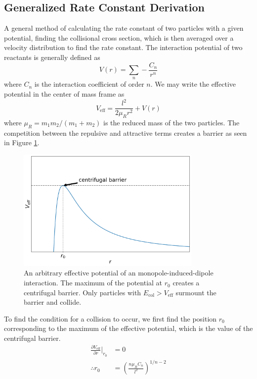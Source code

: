 \subsection{Generalized Rate Constant Derivation} \label{sec: ACT}
A general method of calculating the rate constant of two particles with a given potential, finding the collisional cross section, which is then averaged over a velocity distribution to find the rate constant.\cite{Zhang2017} The interaction potential of two reactants is generally defined as
\begin{equation}
    V(r) = \sum_n - \frac{C_n}{r^n}
\end{equation}
where $C_n$ is the interaction coefficient of order $n$. We may write the effective potential in the center of mass frame as
\begin{equation}
    V_{\mathrm{eff}} = \frac{l^2}{2 \mu_R r^2} + V(r)\label{eq: veff}
\end{equation}
where $\mu_R=m_1 m_2/(m_1 + m_2)$ is the reduced mass of the two particles. The competition between the repulsive and attractive terms creates a barrier as seen in Figure \ref{fig: veff}.
\begin{figure}[H]
	\centering
	\includegraphics[width=0.8\textwidth]{images/v_eff.png}
	\caption{An arbitrary effective potential of an monopole-induced-dipole interaction. The maximum of the potential at $r_0$ creates a centrifugal barrier. Only particles with $E_{\mathrm{col}} > V_{\mathrm{eff}}$ surmount the barrier and collide.}
	\label{fig: veff}
\end{figure}
To find the condition for a collision to occur, we first find the position $r_0$ corresponding to the maximum of the effective potential, which is the value of the centrifugal barrier.
\begin{align*}
    \frac{\partial V_{\mathrm{eff}}}{\partial r}\bigg|_{r_0} & = 0 \\
    \therefore r_0 & = \left(\frac{n \mu_R C_n}{l^2}\right)^{1/n-2}
\end{align*}
